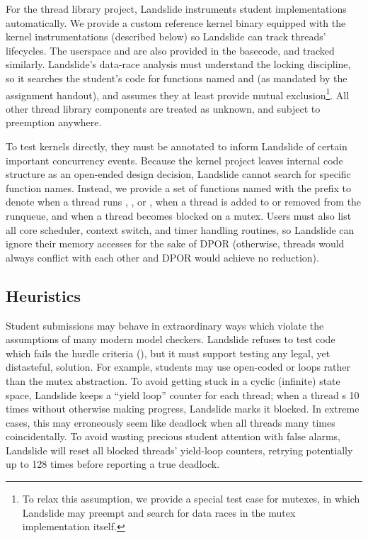For the thread library project, Landslide instruments student implementations automatically.
We provide a custom reference kernel binary equipped with the kernel instrumentations (described below)
so Landslide can track threads' lifecycles. %
The userspace  and  are also provided in the basecode, and tracked similarly.
Landslide's data-race analysis must understand the locking discipline,
so it searches the student's code for functions named  and  (as mandated by the assignment handout),
and assumes they at least provide mutual exclusion\footnote{
	To relax this assumption, we provide a special test case for mutexes,
	in which Landslide may preempt and search for data races in the mutex implementation itself.
}.
All other thread library components are treated as unknown, and subject to preemption anywhere.

To test \pebbles kernels directly, they must be annotated to inform Landslide of certain important concurrency events.
Because the kernel project leaves internal code structure as an open-ended design decision,
Landslide cannot search for specific function names. %
Instead, we provide a set of functions named with the prefix 
to denote when a thread runs , , or , when a thread is added to or removed from the runqueue, and when a thread becomes blocked on a mutex.
Users must also list all core scheduler, context switch, and timer handling routines, so Landslide can ignore their memory accesses for the sake of DPOR
(otherwise, threads would always conflict with each other and DPOR would achieve no reduction).

\subsection{Heuristics}

Student submissions may behave in extraordinary ways which violate the assumptions of many modern model checkers.
Landslide refuses to test code which fails the hurdle criteria (\sect{\ref{sec:grading}}),
but it must support testing any legal, yet distasteful, solution.
For example, students may use open-coded  or  loops rather than the mutex abstraction. %
To avoid getting stuck in a cyclic (infinite) state space, Landslide keeps a ``yield loop'' counter for each thread;
when a thread s 10 times without otherwise making progress, Landslide marks it blocked.
%
In extreme cases, this may erroneously seem like deadlock when all threads  many times coincidentally.
To avoid wasting precious student attention with false alarms, %
Landslide will reset all blocked threads' yield-loop counters,
retrying potentially up to 128 times before reporting a true deadlock.

